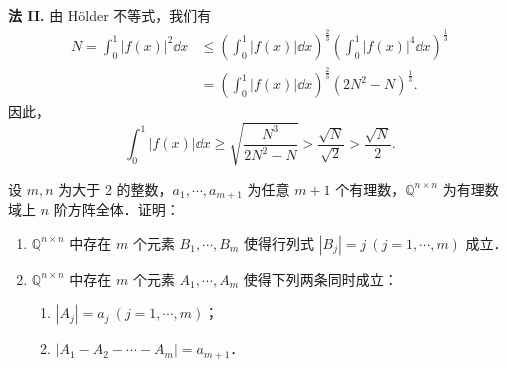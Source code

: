 \begin{solution}
\textbf{法 II.} 由 Hölder 不等式，我们有
\begin{align*}
  N=\int_0^1|f(x)|^2\dd x
  &\leqslant\left(\int_0^1|f(x)|\dd x\right)^{\frac{2}{3}}
  \left(\int_0^1|f(x)|^4\dd x\right)^{\frac{1}{3}}\\
  &=\left(\int_0^1|f(x)|\dd x\right)^{\frac{2}{3}}\left(2N^2-N\right)^{\frac{1}{3}}.
\end{align*}
因此，
\[
  \int_0^1|f(x)|\dd x\geqslant\sqrt{\frac{N^3}{2N^2-N}}
  >\frac{\sqrt{N}}{\sqrt{2}}>\frac{\sqrt{N}}{2}.
\]
\end{solution}

设 $m,n$ 为大于 2 的整数，$a_1,\cdots,a_{m+1}$ 为任意 $m+1$ 个有理数，$\mathbb{Q}^{n\times n}$ 为有理数域上 $n$ 阶方阵全体．证明：
\begin{enumerate}[label=(\arabic*)]
  \item $\mathbb{Q}^{n\times n}$ 中存在 $m$ 个元素 $B_1,\cdots,B_m$ 使得行列式 $|B_j|=j\ (j=1,\cdots,m)$ 成立．
  \item $\mathbb{Q}^{n\times n}$ 中存在 $m$ 个元素 $A_1,\cdots,A_m$ 使得下列两条同时成立：
  \begin{enumerate}[label=(\roman*)]
    \item $|A_j|=a_j\ (j=1,\cdots,m)$；
    \item $|A_1-A_2-\cdots-A_m|=a_{m+1}$．
  \end{enumerate}
\end{enumerate}
